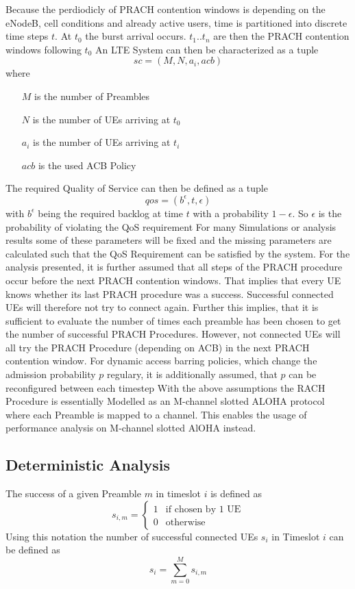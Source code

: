 \documentclass[conference]{IEEEtran}
\begin{document}
Because the perdiodicly of PRACH contention windows is depending on the eNodeB, cell conditions and already active users, time is partitioned into discrete time steps $t$.
At $t_0$ the burst arrival occurs.
$t_1 .. t_n$ are then the PRACH contention windows following $t_0$
An LTE System can then be characterized as a tuple \[sc = (M, N, a_i, acb)\]
where \begin{itemize}
          \item[$M$] is the number of Preambles
          \item[$N$] is the number of UEs arriving at $t_0$
          \item[$a_i$] is the number of UEs arriving at $t_i$
          \item[$acb$] is the used ACB Policy
\end{itemize}

The required Quality of Service can then be defined as a tuple \[qos = (b^\epsilon, t, \epsilon)\]
with $b^\epsilon$ being the required backlog at time $t$ with a probability $1-\epsilon$.
So $\epsilon$ is the probability of violating the QoS requirement
For many Simulations or analysis results some of these parameters will be fixed and the missing parameters are calculated such that the QoS Requirement can be satisfied by the system.
For the analysis presented, it is further assumed that all steps of the PRACH procedure occur before the next PRACH contention windows.
That implies that every UE knows whether its last PRACH procedure was a success.
Successful connected UEs will therefore not try to connect again.
Further this implies, that it is sufficient to evaluate the number of times each preamble has been chosen to get the number of successful PRACH Procedures.
However, not connected UEs will all try the PRACH Procedure (depending on ACB) in the next PRACH contention window.
For dynamic access barring policies, which change the admission probability $p$ regulary,  it is additionally assumed, that $p$ can be reconfigured between each timestep
With the above assumptions the RACH Procedure is essentially Modelled as an M-channel slotted ALOHA protocol where each Preamble is mapped to a channel.
This enables the usage of performance analysis on M-channel slotted AlOHA instead.
\subsection{Deterministic Analysis}\label{deterministic}
The success of a given Preamble $m$ in timeslot $i$ is defined as
        \[s_{i,m}= \begin{cases}
                       1& \text{if chosen by 1 UE}\\
                       0 &\text{otherwise}
        \end{cases}\]
Using this notation the number of successful connected UEs $s_i$ in Timeslot $i$ can be defined as
\[s_i = \sum_{m = 0}^M s_{i,m}\]
\end{document}
